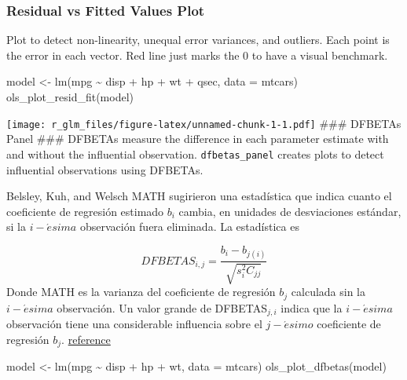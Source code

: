 \documentclass[
]{article}
\newenvironment{Shaded}{\begin{snugshade}}{\end{snugshade}}
\newcommand{\AttributeTok}[1]{\textcolor[rgb]{0.77,0.63,0.00}{#1}}
\newcommand{\FunctionTok}[1]{\textcolor[rgb]{0.00,0.00,0.00}{#1}}
\newcommand{\NormalTok}[1]{#1}
\newcommand{\OtherTok}[1]{\textcolor[rgb]{0.56,0.35,0.01}{#1}}
\newcommand{\SpecialCharTok}[1]{\textcolor[rgb]{0.00,0.00,0.00}{#1}}
\begin{document}
\hypertarget{residual-vs-fitted-values-plot}{%
\subsubsection{Residual vs Fitted Values
Plot}\label{residual-vs-fitted-values-plot}}

Plot to detect non-linearity, unequal error variances, and outliers.
Each point is the error in each vector. Red line just marks the 0 to
have a visual benchmark.

\begin{Shaded}
\begin{Highlighting}[]
\NormalTok{model }\OtherTok{\textless{}{-}} \FunctionTok{lm}\NormalTok{(mpg }\SpecialCharTok{\textasciitilde{}}\NormalTok{ disp }\SpecialCharTok{+}\NormalTok{ hp }\SpecialCharTok{+}\NormalTok{ wt }\SpecialCharTok{+}\NormalTok{ qsec, }\AttributeTok{data =}\NormalTok{ mtcars)}
\FunctionTok{ols\_plot\_resid\_fit}\NormalTok{(model)}
\end{Highlighting}
\end{Shaded}

\texttt{[image: r\_glm\_files/figure-latex/unnamed-chunk-1-1.pdf]} \#\#\#
DFBETAs Panel \#\#\# DFBETAs measure the difference in each parameter
estimate with and without the influential observation.
\texttt{dfbetas\_panel} creates plots to detect influential observations
using DFBETAs.

Belsley, Kuh, and Welsch MATH sugirieron una estadística que indica
cuanto el coeficiente de regresión estimado \(b_{i}\) cambia, en
unidades de desviaciones estándar, si la \(i-\acute {e}sima\)
observación fuera eliminada. La estadística es

\[ DFBETAS_{i,j} = \frac{b_{i}-b_{j(i)}}{\sqrt{s^2_{i}C_{jj}}} \] Donde
MATH es la varianza del coeficiente de regresión \(b_{j}\) calculada sin
la \(i-\acute{e}sima\) observación. Un valor grande de DFBETAS\(_{j,i}\)
indica que la \(i-\acute{e}sima\) observación tiene una considerable
influencia sobre el \(j-\acute{e}simo\) coeficiente de regresión
\(b_{j}\).
\href{http://red.unal.edu.co/cursos/ciencias/2007315/html/un6/cont_12_73.html}{reference}

\begin{Shaded}
\begin{Highlighting}[]
\NormalTok{model }\OtherTok{\textless{}{-}} \FunctionTok{lm}\NormalTok{(mpg }\SpecialCharTok{\textasciitilde{}}\NormalTok{ disp }\SpecialCharTok{+}\NormalTok{ hp }\SpecialCharTok{+}\NormalTok{ wt, }\AttributeTok{data =}\NormalTok{ mtcars)}
\FunctionTok{ols\_plot\_dfbetas}\NormalTok{(model)}
\end{Highlighting}
\end{Shaded}
\end{document}
